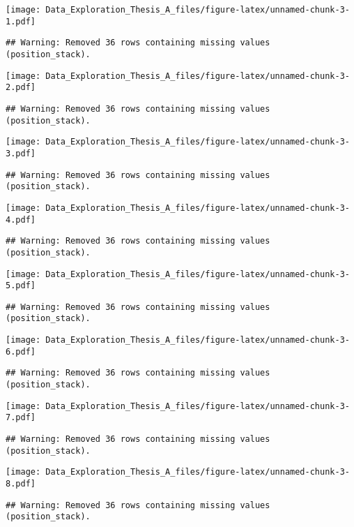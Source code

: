 \documentclass[]{article}
\begin{document}
\texttt{[image: Data\_Exploration\_Thesis\_A\_files/figure-latex/unnamed-chunk-3-1.pdf]}

\begin{verbatim}
## Warning: Removed 36 rows containing missing values (position_stack).
\end{verbatim}

\texttt{[image: Data\_Exploration\_Thesis\_A\_files/figure-latex/unnamed-chunk-3-2.pdf]}

\begin{verbatim}
## Warning: Removed 36 rows containing missing values (position_stack).
\end{verbatim}

\texttt{[image: Data\_Exploration\_Thesis\_A\_files/figure-latex/unnamed-chunk-3-3.pdf]}

\begin{verbatim}
## Warning: Removed 36 rows containing missing values (position_stack).
\end{verbatim}

\texttt{[image: Data\_Exploration\_Thesis\_A\_files/figure-latex/unnamed-chunk-3-4.pdf]}

\begin{verbatim}
## Warning: Removed 36 rows containing missing values (position_stack).
\end{verbatim}

\texttt{[image: Data\_Exploration\_Thesis\_A\_files/figure-latex/unnamed-chunk-3-5.pdf]}

\begin{verbatim}
## Warning: Removed 36 rows containing missing values (position_stack).
\end{verbatim}

\texttt{[image: Data\_Exploration\_Thesis\_A\_files/figure-latex/unnamed-chunk-3-6.pdf]}

\begin{verbatim}
## Warning: Removed 36 rows containing missing values (position_stack).
\end{verbatim}

\texttt{[image: Data\_Exploration\_Thesis\_A\_files/figure-latex/unnamed-chunk-3-7.pdf]}

\begin{verbatim}
## Warning: Removed 36 rows containing missing values (position_stack).
\end{verbatim}

\texttt{[image: Data\_Exploration\_Thesis\_A\_files/figure-latex/unnamed-chunk-3-8.pdf]}

\begin{verbatim}
## Warning: Removed 36 rows containing missing values (position_stack).
\end{verbatim}
\end{document}
